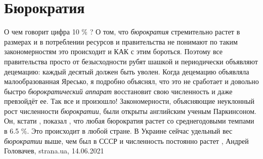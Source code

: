  
 
 
 
 
\chapter{Бюрократия}

О чем говорит цифра 10 \% ?  О том, что \emph{бюрократия} стремительно растет в
размерах и в потреблении ресурсов и правительства не понимают по таким
закономерностям это происходит и КАК с этим бороться. Поэтому все правительства
просто от безысходности рубят шашкой и периодически объявляют децемацию: каждый
десятый должен быть уволен. Когда децемацию объявляла малообразованная Яресько,
я подробно объяснял, что это не сработает и довольно быстро
\emph{бюрократический аппарат} восстановит свою численность и даже превзойдёт
ее.  Так все и произошло!  Закономерности, объясняющие неуклонный рост
численности \emph{бюрократии}, были открыты английским ученым Паркинсоном. Он,
кстати , показал , что любая бюрократия растет со среднегодовыми темпами в 6.5
\%. Это происходит в любой стране. В Украине сейчас удельный вес
\emph{бюрократии} выше, чем был в СССР и численность постоянно растет
, 
Андрей Головачев, strana.ua, 14.06.2021


